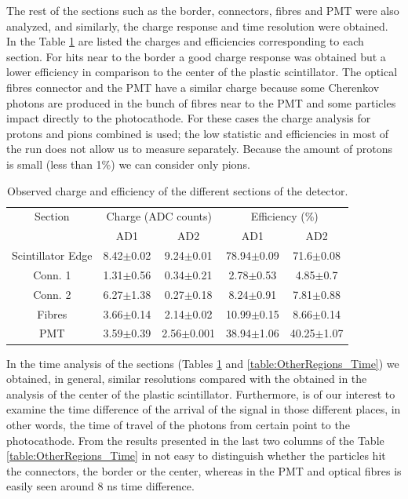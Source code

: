 	The rest of the sections such as the border, connectors, fibres and PMT were also analyzed, and similarly, the charge response and time resolution were obtained. In the Table \ref{table:OtherRegions} are	listed the charges and efficiencies corresponding to each section. For hits near to the border a good charge response was obtained but a lower efficiency in comparison to the center of the plastic scintillator. 
	The optical fibres connector and the PMT have a similar charge because some Cherenkov  photons are produced in the bunch of fibres near to the PMT and some particles impact directly to the photocathode. %
	For these cases the charge analysis for protons and pions combined is used; the low statistic and efficiencies in most of the run does not allow us to measure separately. Because the amount of protons is small (less than 1\%) we can consider only pions.


    \begin{table}[hb!]
      \centering
	\caption{Observed charge and efficiency of the different sections of the detector.}
      \begin{tabular}{|c||c c|c c|}
	 \hline
	Section  &	\multicolumn{2}{c|}{Charge (ADC counts)} &\multicolumn{2}{c|}{Efficiency (\%)}  \\
		 & 	AD1&		AD2&		AD1&		AD2 \\ \hline \hline
	  Scintillator Edge &	8.42$\pm$0.02&	9.24$\pm$0.01&	78.94$\pm$0.09&	71.6$\pm$0.08\\
	  Conn. 1&	1.31$\pm$0.56&	0.34$\pm$0.21&	2.78$\pm$0.53&	4.85$\pm$0.7\\
	  Conn. 2&	6.27$\pm$1.38&	0.27$\pm$0.18&	8.24$\pm$0.91&	7.81$\pm$0.88\\
	  Fibres&	3.66$\pm$0.14&	2.14$\pm$0.02&	10.99$\pm$0.15&	8.66$\pm$0.14\\
	  PMT	&       3.59$\pm$0.39&	2.56$\pm$0.001&	38.94$\pm$1.06&	40.25$\pm$1.07\\
	  \hline
	\end{tabular}
	\label{table:OtherRegions}
    \end{table}

	In the time analysis of the sections (Tables \ref{table:OtherRegions} and \ref{table:OtherRegions_Time}) we obtained, in general, similar resolutions compared with the obtained in the analysis of the center of the plastic scintillator.
	Furthermore, is of our interest to examine the time difference of the arrival of the signal in those different places, in other words, the time of travel of the photons from certain point to the photocathode. From the results presented in the last two columns of the Table \ref{table:OtherRegions_Time} in not easy to distinguish whether the particles hit the connectors, the border or the center, whereas in the PMT and optical fibres is easily seen around 8 ns time difference. %

